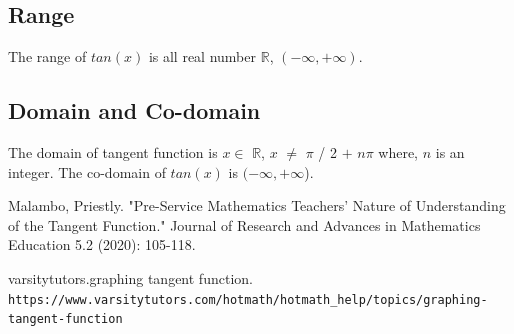\documentclass[letterpaper, 11pt]{report}
\begin{document}
 \subsection*{Range}
 \normalsize{ The range of $tan(x)$ is all real number $\mathbb{R}$, $(- \infty, + \infty)$. }
 
 \subsection*{Domain and Co-domain}
 \normalsize{The domain of tangent function is $x \in$ $\mathbb{R}$, $x$ $\neq$ $\pi$ / 2 $+$ $n \pi$ where, $n$ is an integer. The co-domain of $tan(x)$ is \((-\infty, +\infty\)).}
 
 
 \begin{thebibliography}{}
 
Malambo, Priestly. "Pre-Service Mathematics Teachers' Nature of Understanding of the Tangent Function." Journal of Research and Advances in Mathematics Education 5.2 (2020): 105-118.

varsitytutors.graphing tangent function. 
\\\texttt{https://www.varsitytutors.com/hotmath/hotmath_help/topics/graphing-tangent-function}


\end{thebibliography}
 
 
 
 
\pagebreak
\end{document}
